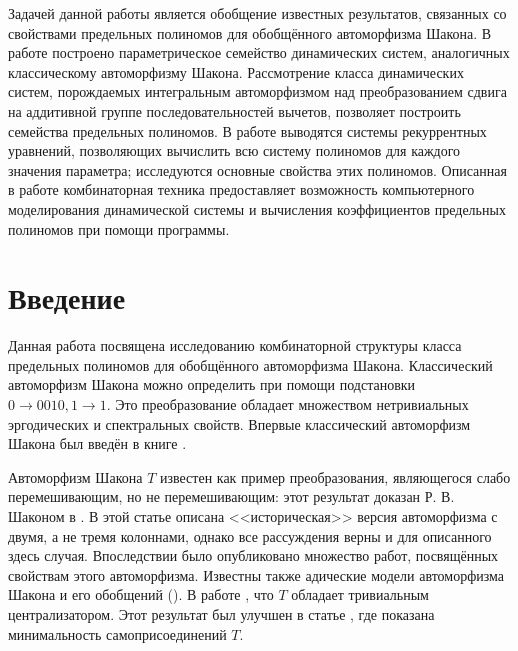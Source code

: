 \documentclass[14pt, a4paper, russian]{report}
\begin{document}
Задачей данной работы является обобщение известных результатов, связанных со свойствами предельных полиномов для обобщённого автоморфизма Шакона. В работе построено параметрическое семейство динамических систем, аналогичных классическому автоморфизму Шакона. Рассмотрение класса динамических систем, порождаемых интегральным автоморфизмом над преобразованием сдвига на аддитивной группе последовательностей вычетов, позволяет построить семейства предельных полиномов. В работе выводятся системы рекуррентных уравнений, позволяющих вычислить всю систему полиномов для каждого значения параметра; исследуются основные свойства этих полиномов. Описанная в работе комбинаторная техника предоставляет возможность компьютерного моделирования динамической системы и вычисления коэффициентов предельных полиномов при помощи программы.


\tableofcontents{}

\chapter*{Введение}
Данная работа посвящена исследованию комбинаторной структуры класса предельных полиномов для обобщённого автоморфизма Шакона. Классический автоморфизм Шакона можно определить при помощи подстановки $0 \to 0010, 1 \to 1$. Это преобразование обладает множеством нетривиальных эргодических и спектральных свойств. Впервые классический автоморфизм Шакона был введён в книге \cite{friedman}. 

Автоморфизм Шакона $T$ известен как пример преобразования, являющегося слабо перемешивающим, но не перемешивающим: этот результат доказан Р. В. Шаконом в \cite{mixing}. В этой статье описана <<историческая>> версия автоморфизма с двумя, а не тремя колоннами, однако все рассуждения верны и для описанного здесь случая. Впоследствии было опубликовано множество работ, посвящённых свойствам этого автоморфизма. Известны также адические модели автоморфизма Шакона и его обобщений (\cite{park}). В работе \cite{deljunco}, что $T$ обладает тривиальным централизатором. Этот результат был улучшен в статье \cite{joinings}, где показана минимальность самоприсоединений $T$. 
\end{document}
